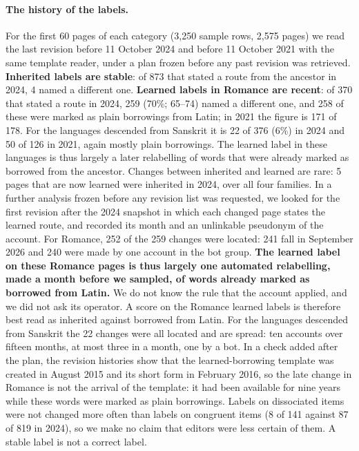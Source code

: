 \documentclass[11pt]{article}
\begin{document}
\paragraph{The history of the labels.} For the first 60 pages of each category (3,250 sample rows, 2,575 pages) we read the last revision before 11 October 2024 and before 11 October 2021 with the same template reader, under a plan frozen before any past revision was retrieved. \textbf{Inherited labels are stable}: of 873 that stated a route from the ancestor in 2024, 4 named a different one. \textbf{Learned labels in Romance are recent}: of 370 that stated a route in 2024, 259 (70\%; 65--74) named a different one, and 258 of these were marked as plain borrowings from Latin; in 2021 the figure is 171 of 178. For the languages descended from Sanskrit it is 22 of 376 (6\%) in 2024 and 50 of 126 in 2021, again mostly plain borrowings. The learned label in these languages is thus largely a later relabelling of words that were already marked as borrowed from the ancestor. Changes between inherited and learned are rare: 5 pages that are now learned were inherited in 2024, over all four families. In a further analysis frozen before any revision list was requested, we looked for the first revision after the 2024 snapshot in which each changed page states the learned route, and recorded its month and an unlinkable pseudonym of the account. For Romance, 252 of the 259 changes were located: 241 fall in September 2026 and 240 were made by one account in the bot group. \textbf{The learned label on these Romance pages is thus largely one automated relabelling, made a month before we sampled, of words already marked as borrowed from Latin.} We do not know the rule that the account applied, and we did not ask its operator. A score on the Romance learned labels is therefore best read as inherited against borrowed from Latin. For the languages descended from Sanskrit the 22 changes were all located and are spread: ten accounts over fifteen months, at most three in a month, one by a bot. In a check added after the plan, the revision histories show that the learned-borrowing template was created in August 2015 and its short form in February 2016, so the late change in Romance is not the arrival of the template: it had been available for nine years while these words were marked as plain borrowings. Labels on dissociated items were not changed more often than labels on congruent items (8 of 141 against 87 of 819 in 2024), so we make no claim that editors were less certain of them. A stable label is not a correct label.
\end{document}
